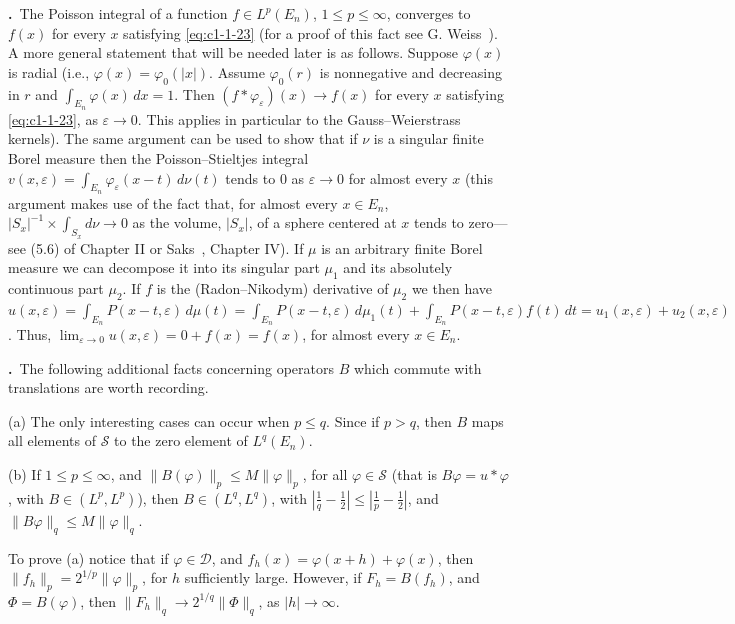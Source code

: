 \label{eq:c1-4-10}\textbf{\theequation.}~The Poisson
integral of a function $f \in L^{p}(E_{n})$, $1 \leq p \leq \infty$, converges
to $f(x)$ for every $x$ satisfying \eqref{eq:c1-1-23} (for a proof of this
fact see G. Weiss~\cite{Weiss2}). A more general statement that will be needed
later is as follows. Suppose $\varphi(x)$ is radial (i.e.,
$\varphi(x) = \varphi_{0}(|x|)$. Assume $\varphi_{0}(r)$ is nonnegative and
decreasing in $r$ and $\int_{E_{n}} \varphi(x) \, dx = 1$. Then
$(f * \varphi_{\varepsilon})(x) \to f(x)$ for every $x$ satisfying
\eqref{eq:c1-1-23}, as $\varepsilon \to 0$. This applies in particular to the
Gauss--Weierstrass kernels). The same argument can be used to show that if
$\nu$ is a singular finite Borel measure then the Poisson--Stieltjes integral
$v(x, \varepsilon) = \int_{E_{n}} \varphi_{\varepsilon}(x - t) \, d\nu(t)$
tends to $0$ as $\varepsilon \to 0$ for almost every $x$ (this argument makes
use of the fact that, for almost every $x \in E_{n}$,
$|S_{x}|^{-1} \times \int_{S_{x}} d\nu \to 0$ as the volume, $|S_{x}|$, of a
sphere centered at $x$ tends to zero---see (5.6) of Chapter II or
Saks~\cite{Saks1}, Chapter IV). If $\mu$ is an arbitrary finite Borel measure
we can decompose it into its singular part $\mu_{1}$ and its absolutely
continuous part $\mu_{2}$. If $f$ is the (Radon--Nikodym) derivative of
$\mu_{2}$ we then have
$u(x, \varepsilon) = \int_{E_{n}} P(x - t, \varepsilon) \, d\mu(t) = \int_{E_{n}} P(x - t, \varepsilon) \, d\mu_{1}(t) + \int_{E_{n}} P(x - t, \varepsilon)f(t) \, dt = u_{1}(x, \varepsilon) + u_{2}(x, \varepsilon)$.
Thus, $\lim_{\varepsilon\to0} u(x, \varepsilon) = 0 + f(x) = f(x)$, for almost
every $x \in E_{n}$.

\label{eq:c1-4-11}\textbf{\theequation.}~The
following additional facts concerning operators $B$ which commute with
translations are worth recording.

\textup{(a)} The only interesting cases can occur when $p \leq q$. Since if
$p > q$, then $B$ maps all elements of $\mathscr{S}$ to the zero element of
$L^{q}(E_{n})$.

\textup{(b)} If $1 \leq p \leq \infty$, and $\|B(\varphi)\|_{p} \leq M \|\varphi\|_{p}$,
for all $\varphi \in \mathscr{S}$ (that is $B\varphi = u * \varphi$, with
$B \in (L^{p}, L^{p})$), then $B \in (L^{q}, L^{q})$, with
$\left|\frac{1}{q} - \frac{1}{2}\right| \leq \left|\frac{1}{p} - \frac{1}{2}\right|$,
and $\|B\varphi\|_{q} \leq M \|\varphi\|_{q}$.

To prove (a) notice that if $\varphi \in \mathscr{D}$, and
$f_{h}(x) = \varphi(x + h) + \varphi(x)$, then
$\|f_{h}\|_{p} = 2^{1/p}\|\varphi\|_{p}$, for $h$ sufficiently large. However,
if $F_{h} = B(f_{h})$, and $\Phi = B(\varphi)$, then
$\|F_{h}\|_{q} \to 2^{1/q}\|\Phi\|_{q}$, as $|h| \to \infty$.


